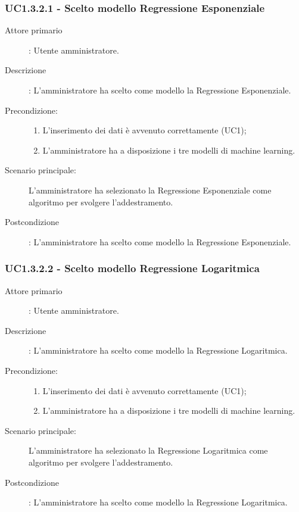 \subsubsection{UC1.3.2.1 - Scelto modello Regressione Esponenziale}
\label{sssec:uc1.3.2.1}
\begin{description}
  \item[Attore primario]: Utente amministratore.
  \item[Descrizione]: L'amministratore ha scelto come modello la Regressione Esponenziale.
  \item[Precondizione:]
  \begin{enumerate}
    \item L'inserimento dei dati è avvenuto correttamente (UC1);
    \item L'amministratore ha a disposizione i tre modelli di machine learning.
  \end{enumerate}
  \item[Scenario principale:] L'amministratore ha selezionato la Regressione Esponenziale come algoritmo per svolgere l'addestramento.
  \item[Postcondizione]: L'amministratore ha scelto come modello la Regressione Esponenziale.
\end{description}

\subsubsection{UC1.3.2.2 - Scelto modello Regressione Logaritmica}
\label{sssec:uc1.3.2.2}
\begin{description}
  \item[Attore primario]: Utente amministratore.
  \item[Descrizione]: L'amministratore ha scelto come modello la Regressione Logaritmica.
  \item[Precondizione:]
  \begin{enumerate}
    \item L'inserimento dei dati è avvenuto correttamente (UC1);
    \item L'amministratore ha a disposizione i tre modelli di machine learning.
  \end{enumerate}
  \item[Scenario principale:] L'amministratore ha selezionato la Regressione Logaritmica come algoritmo per svolgere l'addestramento.
  \item[Postcondizione]: L'amministratore ha scelto come modello la Regressione Logaritmica.
\end{description}

